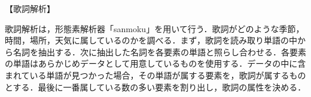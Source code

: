 【歌詞解析】
\par
\par 歌詞解析は，形態素解析器「sanmoku」を用いて行う．歌詞がどのような季節，時間，場所，天気に属しているのかを調べる．まず，歌詞を読み取り単語の中から名詞を抽出する．次に抽出した名詞を各要素の単語と照らし合わせる．各要素の単語はあらかじめデータとして用意しているものを使用する．データの中に含まれている単語が見つかった場合，その単語が属する要素を，歌詞が属するものとする．最後に一番属している数の多い要素を割り出し，歌詞の属性を決める．

